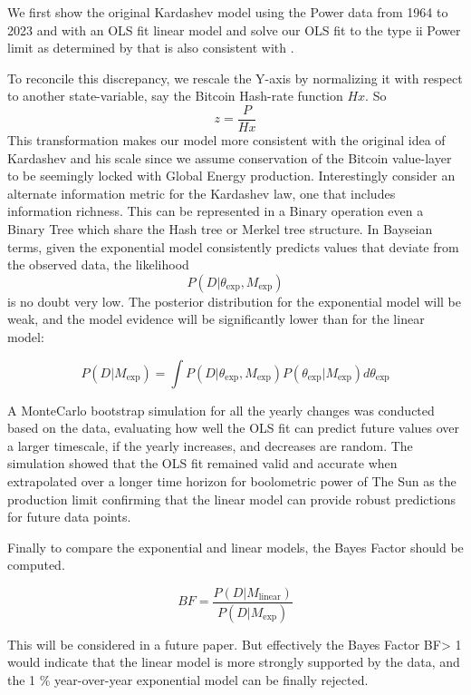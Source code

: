 \documentclass[final,5p,times,twocolumn,authoryear]{elsarticle}
\begin{document}
We first show the original Kardashev model using the Power data from 1964 to 2023 and with an OLS fit linear model and solve our OLS fit to the type ii Power limit as determined by \cite{kar64} that is also consistent with \cite{sagan73}.

To reconcile this discrepancy, we rescale the Y-axis by normalizing it with respect to another state-variable, say the Bitcoin Hash-rate function $H{x}$. So $$z=\frac{P}{Hx}$$ This transformation makes our model more consistent with the original idea of Kardashev and his scale since we assume conservation of the Bitcoin value-layer to be seemingly locked with Global Energy production. Interestingly \cite{sagan73} consider an alternate information metric for the Kardashev law, one that includes information richness. This can be represented in a Binary operation even a Binary Tree which share the Hash tree or Merkel tree structure. In Bayseian terms, given the exponential model consistently predicts values that deviate from the observed data, the likelihood $$ P(D | \theta_{\text{exp}}, M_{\text{exp}})$$ is no doubt very low. The posterior distribution for the exponential model will be weak, and the model evidence will be significantly lower than for the linear model:

$$P(D | M_{\text{exp}}) = \int P(D | \theta_{\text{exp}}, M_{\text{exp}}) P(\theta_{\text{exp}} | M_{\text{exp}}) d\theta_{\text{exp}}
$$

A MonteCarlo bootstrap simulation for all the yearly changes was conducted based on the data, evaluating how well the OLS fit can predict future values over a larger timescale, if the yearly increases, and decreases are random. The simulation showed that the OLS fit remained valid and accurate when extrapolated over a longer time horizon for boolometric power of The Sun as the production limit confirming that the linear model can provide robust predictions for future data points. 

Finally to compare the exponential and linear models, the Bayes Factor should be computed.

$$BF = \frac{P(D | M_{\text{linear}})}{P(D | M_{\text{exp}})}
$$

This will be considered in a future paper. But effectively the Bayes Factor BF> 1 would indicate that the linear model is more strongly supported by the data, and the 1 \% year-over-year exponential model can be finally rejected.
\end{document}
